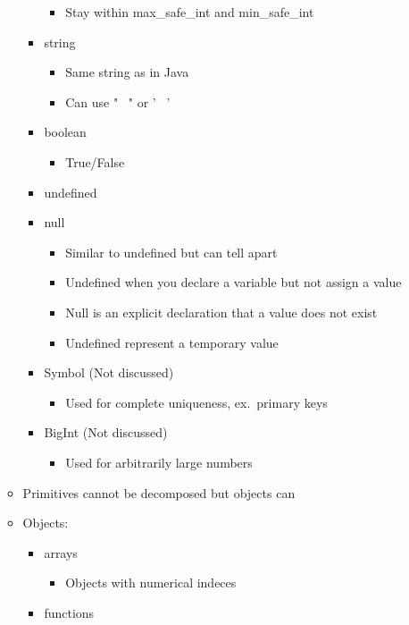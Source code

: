 \documentclass{article}
\begin{document}
\begin{itemize}
\begin{itemize}
\begin{itemize}
\begin{itemize}
          \item Stay within max\_safe\_int and min\_safe\_int
        \end{itemize}
        \item string
        \begin{itemize}
          \item Same string as in Java  
          \item Can use " \ " or ' \ '
        \end{itemize}
        \item boolean
        \begin{itemize}
          \item True/False
        \end{itemize}
        \item undefined
        \item null
        \begin{itemize}
          \item Similar to undefined but can tell apart
          \item Undefined when you declare a variable but not assign a value
          \item Null is an explicit declaration that a value does not exist
          \item Undefined represent a temporary value
        \end{itemize}
        \item Symbol (Not discussed)
        \begin{itemize}
          \item Used for complete uniqueness, ex.\ primary keys
        \end{itemize}
        \item BigInt (Not discussed)
        \begin{itemize}
          \item Used for arbitrarily large numbers
        \end{itemize}
      \end{itemize}
      \item Primitives cannot be decomposed but objects can
      \item Objects:
      \begin{itemize}
        \item arrays
        \begin{itemize}
          \item Objects with numerical indeces
        \end{itemize}
        \item functions

\end{itemize}
\end{itemize}
\end{itemize}
\end{document}
